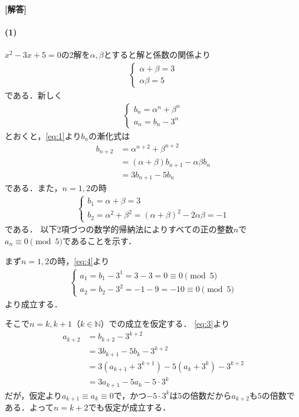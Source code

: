 \documentclass[../../main.tex]{subfiles}
\begin{document}
\begin{oframed}
  
\end{oframed}

{\bf [解答]}
\paragraph{(1)}

$x^2-3x+5=0$の2解を$\alpha,\beta$とすると解と係数の関係より
\begin{align}
  \begin{cases}
    \alpha+\beta=3 \\
    \alpha\beta=5
  \end{cases} \label{eq:1}
\end{align}
である．新しく
\begin{align}
  \begin{cases}
    b_n=\alpha^n+\beta^n \\
    a_n=b_n-3^n
  \end{cases} \label{eq:2}
\end{align}
とおくと，\cref{eq:1}より$b_n$の漸化式は
\begin{align}
  b_{n+2}
  &=\alpha^{n+2}+\beta^{n+2} \\
  &=(\alpha+\beta)b_{n+1}-\alpha\beta b_n \\
  &=3b_{n+1}-5b_n \label{eq:3}
\end{align}
である．また，$n=1,2$の時
\begin{align}
  \begin{cases}
    b_1 = \alpha + \beta = 3 \\
    b_2 = \alpha^2 + \beta^2 = (\alpha+\beta)^2 - 2\alpha\beta = -1
  \end{cases} \label{eq:4}
\end{align}
である．
以下$2$項づつの数学的帰納法によりすべての正の整数$n$で$a_n\equiv0\pmod5$であることを示す．

まず$n=1,2$の時，\cref{eq:4}より
\begin{align}
  \begin{cases}
    a_1 = b_1 - 3^{1} = 3-3 = 0 \equiv0\pmod5 \\
    a_2 = b_2 - 3^{2} = -1 -9 = -10 \equiv0\pmod5
  \end{cases}
\end{align}
より成立する．

そこで$n=k,k+1$（$k\in\mathbb N$）での成立を仮定する．
\cref{eq:3}より
\begin{align}
  a_{k+2}
  &=b_{k+2}-3^{k+2} \\
  &=3b_{k+1}-5b_k-3^{k+2}\\
  &=3(a_{k+1}+3^{k+1})-5(a_k+3^k)-3^{k+2} \\
  &=3a_{k+1}-5a_k-5\cdot3^k
\end{align}
だが，仮定より$a_{k+1}\equiv a_k\equiv0$で，かつ$-5\cdot3^k$は$5$の倍数だから$a_{k+2}$も$5$の倍数である．よって$n=k+2$でも仮定が成立する．
\end{document}
